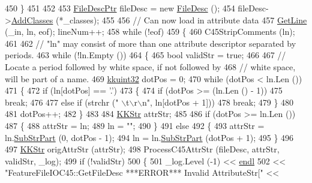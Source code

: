 \begin{DoxyCode}
450   \}
451 
452 
453   \hyperlink{class_k_k_m_l_l_1_1_file_desc}{FileDescPtr}  fileDesc = \textcolor{keyword}{new} \hyperlink{class_k_k_m_l_l_1_1_file_desc}{FileDesc} ();
454   fileDesc->\hyperlink{class_k_k_m_l_l_1_1_file_desc_abeb0ede4c660ec82b0107924acfd9a45}{AddClasses} (*\_classes);
455 
456   \textcolor{comment}{// Can now load in attribute data}
457   \hyperlink{class_k_k_m_l_l_1_1_feature_file_i_o_a61ca11485d2c14368c1019bfcc53ab16}{GetLine} (\_in, ln, eof);  lineNum++;
458   \textcolor{keywordflow}{while}  (!eof)
459   \{
460     C45StripComments (ln);
461 
462     \textcolor{comment}{// "ln"  may consist of more than one attribute descriptor separated by periods.}
463     \textcolor{keywordflow}{while}  (!ln.Empty ())
464     \{
465       \textcolor{keywordtype}{bool}  validStr = \textcolor{keyword}{true};
466 
467       \textcolor{comment}{// Locate a period followed by white space, if not followed by }
468       \textcolor{comment}{// white space, will be part of a name.}
469       \hyperlink{namespace_k_k_b_af8d832f05c54994a1cce25bd5743e19a}{kkuint32}  dotPos = 0;
470       \textcolor{keywordflow}{while}  (dotPos < ln.Len ())
471       \{
472         \textcolor{keywordflow}{if}  (ln[dotPos] == \textcolor{charliteral}{'.'})
473         \{
474           \textcolor{keywordflow}{if}  (dotPos >= (ln.Len () - 1))
475             \textcolor{keywordflow}{break};
476 
477           \textcolor{keywordflow}{else} \textcolor{keywordflow}{if}  (strchr (\textcolor{stringliteral}{" \(\backslash\)t\(\backslash\)r\(\backslash\)n"}, ln[dotPos + 1]))
478             \textcolor{keywordflow}{break};
479         \}
480 
481         dotPos++;
482       \}
483 
484       \hyperlink{class_k_k_b_1_1_k_k_str}{KKStr}  attrStr;
485 
486       \textcolor{keywordflow}{if}  (dotPos >= ln.Len ())
487       \{
488         attrStr = ln;
489         ln = \textcolor{stringliteral}{""};
490       \}
491       \textcolor{keywordflow}{else}
492       \{
493         attrStr = ln.\hyperlink{class_k_k_b_1_1_k_k_str_a5f20b2ddfc9f07c8ef99592810332ddb}{SubStrPart} (0, dotPos - 1);
494         ln = ln.\hyperlink{class_k_k_b_1_1_k_k_str_a5f20b2ddfc9f07c8ef99592810332ddb}{SubStrPart} (dotPos + 1);
495       \}
496 
497       \hyperlink{class_k_k_b_1_1_k_k_str}{KKStr}  origAttrStr (attrStr);
498       ProcessC45AttrStr (fileDesc, attrStr, validStr, \_log);
499       \textcolor{keywordflow}{if}  (!validStr)
500       \{
501         \_log.Level (-1) << \hyperlink{namespace_k_k_b_ad1f50f65af6adc8fa9e6f62d007818a8}{endl}
502                         << \textcolor{stringliteral}{"FeatureFileIOC45::GetFileDesc  ***ERROR***    Invalid AttributeStr["} << 

\end{DoxyCode}
